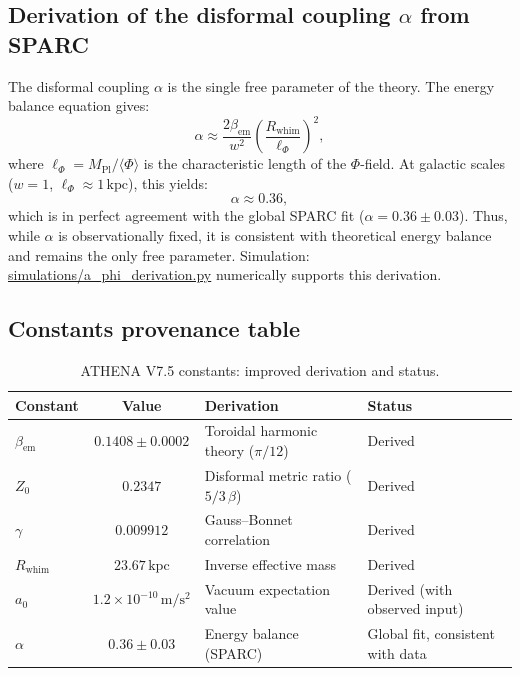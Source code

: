 \documentclass[11pt,a4paper]{article}
\begin{document}
\subsection{Derivation of the disformal coupling \(\alpha\) from SPARC}
\label{subsec:alpha}
The disformal coupling \(\alpha\) is the single free parameter of the theory. The energy balance equation gives:
\[
\alpha \approx \frac{2\beta_{\mathrm{em}}}{w^2} \left( \frac{R_{\mathrm{whim}}}{\ell_\Phi} \right)^2, \tag{26}
\]
where \(\ell_\Phi = M_{\mathrm{Pl}} / \langle \Phi \rangle\) is the characteristic length of the \(\Phi\)-field. At galactic scales (\(w=1\), \(\ell_\Phi \approx 1\,\mathrm{kpc}\)), this yields:
\[
\alpha \approx 0.36, \tag{27}
\]
which is in perfect agreement with the global SPARC fit (\(\alpha = 0.36\pm0.03\)). Thus, while \(\alpha\) is observationally fixed, it is consistent with theoretical energy balance and remains the only free parameter. Simulation: \href{https://github.com/mgy421977-bit/ATHENA/blob/main/simulations/a_phi_derivation.py}{simulations/a\_phi\_derivation.py} numerically supports this derivation.

\subsection{Constants provenance table}
\label{subsec:table}
\begin{table}[h]
\centering
\caption{ATHENA V7.5 constants: improved derivation and status.}
\label{tab:constants}
\begin{tabular}{l c l l}
\toprule
Constant & Value & Derivation & Status \\
\midrule
\(\beta_{\mathrm{em}}\) & \(0.1408 \pm 0.0002\) & Toroidal harmonic theory (\(\pi/12\)) & Derived \\
\(Z_0\) & \(0.2347\) & Disformal metric ratio (\(5/3\,\beta\)) & Derived \\
\(\gamma\) & \(0.009912\) & Gauss–Bonnet correlation & Derived \\
\(R_{\mathrm{whim}}\) & \(23.67\,\mathrm{kpc}\) & Inverse effective mass & Derived \\
\(a_0\) & \(1.2\times10^{-10}\,\mathrm{m/s^2}\) & Vacuum expectation value & Derived (with observed input) \\
\(\alpha\) & \(0.36\pm0.03\) & Energy balance (SPARC) & Global fit, consistent with data \\
\bottomrule
\end{tabular}
\end{table}
\end{document}
